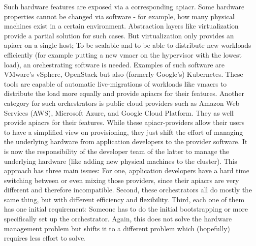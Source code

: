 
Such hardware features are exposed via a corresponding \gls{apiacr}. Some hardware properties cannot be changed via software - for example, how many physical machines exist in a certain environment. Abstraction layers like virtualization provide a partial solution for such cases.
\newline
But virtualization only provides an \gls{apiacr} on a single host; To be scalable and to be able to distribute new workloads efficiently (for example putting a new \gls{vmacr} on the hypervisor with the lowest load), an orchestrating software is needed. Examples of such software are VMware's vSphere, OpenStack but also (formerly Google's) Kubernetes.
\newline
These tools are capable of automatic live-migrations of workloads like \gls{vmacr}s to distribute the load more equally and provide \gls{apiacr}s for their features.
\newline
Another category for such orchestrators is public cloud providers such as Amazon Web Services (AWS), Microsoft Azure, and Google Cloud Platform. They as well provide \gls{apiacr}s for their features.
\newline
While these \gls{apiacr}-providers allow their users to have a simplified view on provisioning, they just shift the effort of managing the underlying hardware from application developers to the provider software. It is now the responsibility of the developer team of the latter to manage the underlying hardware (like adding new physical machines to the cluster).
\newline
This approach has three main issues: For one, application developers have a hard time switching between or even mixing those providers, since their \gls{apiacr}s are very different and therefore incompatible. Second, these orchestrators all do mostly the same thing, but with different efficiency and flexibility. Third, each one of them has one initial requirement: Someone has to do the initial bootstrapping or more specifically set up the orchestrator. Again, this does not solve the hardware management problem but shifts it to a different problem which (hopefully) requires less effort to solve.
